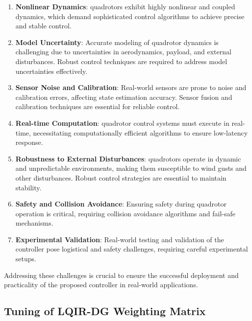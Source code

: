 \documentclass[3p]{elsarticle}
\begin{document}
\begin{enumerate}
  \item \textbf{Nonlinear Dynamics}: quadrotors exhibit highly nonlinear and coupled dynamics, which demand sophisticated control algorithms to achieve precise and stable control.

  \item \textbf{Model Uncertainty}: Accurate modeling of quadrotor dynamics is challenging due to uncertainties in aerodynamics, payload, and external disturbances. Robust control techniques are required to address model uncertainties effectively.

  \item \textbf{Sensor Noise and Calibration}: Real-world sensors are prone to noise and calibration errors, affecting state estimation accuracy. Sensor fusion and calibration techniques are essential for reliable control.

  \item \textbf{Real-time Computation}: quadrotor control systems must execute in real-time, necessitating computationally efficient algorithms to ensure low-latency response.

  \item \textbf{Robustness to External Disturbances}: quadrotors operate in dynamic and unpredictable environments, making them susceptible to wind gusts and other disturbances. Robust control strategies are essential to maintain stability.

  \item \textbf{Safety and Collision Avoidance}: Ensuring safety during quadrotor operation is critical, requiring collision avoidance algorithms and fail-safe mechanisms.

  \item \textbf{Experimental Validation}: Real-world testing and validation of the controller pose logistical and safety challenges, requiring careful experimental setups.

\end{enumerate}

Addressing these challenges is crucial to ensure the successful deployment and practicality of the proposed controller in real-world applications.

\subsection{Tuning of LQIR-DG Weighting Matrix}
\end{document}
